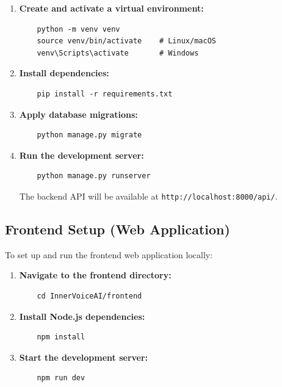 \documentclass[12pt,a4paper]{report}
\begin{document}
\begin{itemize}
\begin{enumerate}
    \item \textbf{Create and activate a virtual environment:}
    \begin{verbatim}
    python -m venv venv
    source venv/bin/activate    # Linux/macOS
    venv\Scripts\activate       # Windows
    \end{verbatim}
    
    \item \textbf{Install dependencies:}
    \begin{verbatim}
    pip install -r requirements.txt
    \end{verbatim}
    
    \item \textbf{Apply database migrations:}
    \begin{verbatim}
    python manage.py migrate
    \end{verbatim}
    
    \item \textbf{Run the development server:}
    \begin{verbatim}
    python manage.py runserver
    \end{verbatim}
    
    The backend API will be available at \texttt{http://localhost:8000/api/}.
\end{enumerate}

\subsection{Frontend Setup (Web Application)}

To set up and run the frontend web application locally:

\begin{enumerate}
    \item \textbf{Navigate to the frontend directory:}
    \begin{verbatim}
    cd InnerVoiceAI/frontend
    \end{verbatim}
    
    \item \textbf{Install Node.js dependencies:}
    \begin{verbatim}
    npm install
    \end{verbatim}
    
    \item \textbf{Start the development server:}
    \begin{verbatim}
    npm run dev
    \end{verbatim}
    

\end{enumerate}
\end{itemize}
\end{document}
